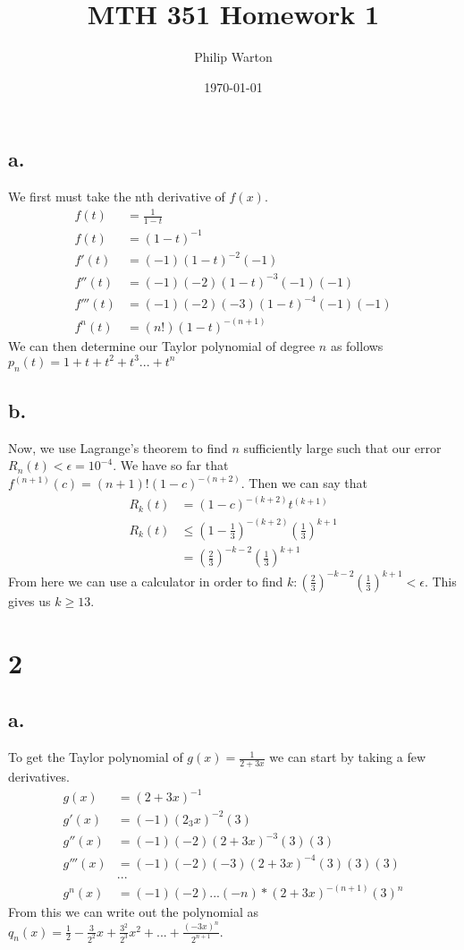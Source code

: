 \documentclass{article}
\begin{document}
\title{MTH 351 Homework 1}
\author{Philip Warton}
\date{\today}
\maketitle

\section{}
\subsection*{a.}
We first must take the nth derivative of $f(x)$.
\begin{align*}
f(t) & = \frac{1}{1-t} \\
f(t) & = (1-t)^{-1} \\
f'(t) & = (-1)(1-t)^{-2}(-1) \\
f''(t) & = (-1)(-2)(1-t)^{-3}(-1)(-1) \\
f'''(t) & = (-1)(-2)(-3)(1-t)^{-4}(-1)(-1) \\
f^{n}(t) & = (n!)(1-t)^{-(n+1)}
\end{align*}
We can then determine our Taylor polynomial of degree $n$ as follows $p_n(t) = 1 + t + t^2 + t^3... + t^n$

\subsection*{b.}
Now, we use Lagrange's theorem to find $n$ sufficiently large such that our error $R_n(t) < \epsilon = 10^{-4}$. We have so far that $f^{(n+1)}(c) = (n+1)!(1-c)^{-(n+2)}$. Then we can say that 
\begin{align*}
R_k(t) & = (1-c)^{-(k+2)}t^{(k+1)} \\
R_k(t) & \leqslant (1-\frac{1}{3})^{-(k+2)}(\frac{1}{3})^{k+1} \\
& = (\frac{2}{3})^{-k-2}(\frac{1}{3})^{k+1}
\end{align*}
From here we can use a calculator in order to find $k : (\frac{2}{3})^{-k-2}(\frac{1}{3})^{k+1} < \epsilon$.
This gives us $k \geqslant 13$.

\section*{2}
\subsection*{a.}
To get the Taylor polynomial of $g(x) = \frac{1}{2+3x}$ we can start by taking a few derivatives.
\begin{align*}
g(x) & = (2 + 3x)^{-1}\\
g'(x) & = (-1)(2_3x)^{-2}(3)\\
g''(x) & = (-1)(-2)(2+3x)^{-3}(3)(3)\\
g'''(x) & = (-1)(-2)(-3)(2 + 3x)^{-4}(3)(3)(3)\\
&...\\
g^n(x) & = (-1)(-2)...(-n)*(2+3x)^{-(n+1)}(3)^n
\end{align*}
From this we can write out the polynomial as $q_n(x) = \frac{1}{2} - \frac{3}{2^2}x + \frac{3^2}{2^3}x^2 + ... +  \frac{(-3x)^n}{2^{n+1}}$.
\end{document}
